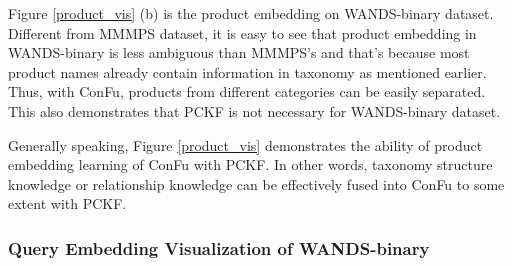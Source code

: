 


Figure \ref{product_vis} (b) is the product embedding on WANDS-binary dataset. Different from MMMPS dataset, it is easy to see that product embedding in WANDS-binary is less ambiguous than MMMPS's and that's because most product names already contain information in taxonomy as mentioned earlier. Thus, with ConFu, products from different categories can be easily separated. This also demonstrates that PCKF is not necessary for WANDS-binary dataset. 

Generally speaking, Figure \ref{product_vis} demonstrates the ability of product embedding learning of ConFu with PCKF. In other words, taxonomy structure knowledge or relationship knowledge can be effectively fused into ConFu to some extent with PCKF.



\subsubsection{Query Embedding Visualization of WANDS-binary}


